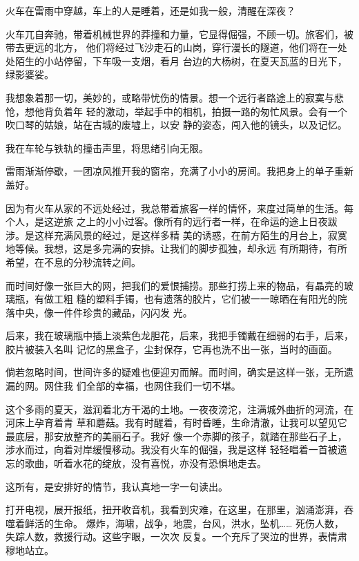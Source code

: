 		火车在雷雨中穿越，车上的人是睡着，还是如我一般，清醒在深夜？

		火车兀自奔驰，带着机械世界的莽撞和力量，它显得倔强，不顾一切。旅客们，被带去更远的北方，
	他们将经过飞沙走石的山岗，穿行漫长的隧道，他们将在一处处陌生的小站停留，下车吸一支烟，看月
	台边的大杨树，在夏天瓦蓝的日光下，绿影婆娑。

		我想象着那一切，美妙的，或略带忧伤的情景。想一个远行者路途上的寂寞与悲怆，想他背负着年
	轻的激动，举起手中的相机，拍摄一路的匆忙风景。会有一个吹口琴的姑娘，站在古城的废墟上，以安
	静的姿态，闯入他的镜头，以及记忆。

		我在车轮与铁轨的撞击声里，将思绪引向无限。

		雷雨渐渐停歇，一团凉风推开我的窗帘，充满了小小的房间。我把身上的单子重新盖好。

		因为有火车从家的不远处经过，我总带着旅客一样的情怀，来度过简单的生活。每个人，是这逆旅
	之上的小小过客。像所有的远行者一样，在命运的途上日夜跋涉。是这样充满风景的经过，是这样多精
	美的诱惑，在前方陌生的月台上，寂寞地等候。我想，这是多完满的安排。让我们的脚步孤独，却永远
	有所期待，有所希望，在不息的分秒流转之间。

		而时间好像一张巨大的网，把我们的爱恨捕捞。那些打捞上来的物品，有晶亮的玻璃瓶，有做工粗
	糙的塑料手镯，也有遗落的胶片，它们被一一晾晒在有阳光的院落中央，像一件件珍贵的藏品，闪闪发
	光。

		后来，我在玻璃瓶中插上淡紫色龙胆花，后来，我把手镯戴在细弱的右手，后来，胶片被装入名叫
	记忆的黑盒子，尘封保存，它再也洗不出一张，当时的画面。

		倘若忽略时间，世间许多的疑难也便迎刃而解。而时间，确实是这样一张，无所遗漏的网。网住我
	们全部的幸福，也网住我们一切不堪。

		这个多雨的夏天，滋润着北方干渴的土地。一夜夜滂沱，注满城外曲折的河流，在河床上孕育着青
	草和蘑菇。我有时醒着，有时昏睡，生命清澈，让我可以望见它最底层，那安放整齐的美丽石子。我好
	像一个赤脚的孩子，就踏在那些石子上，涉水而过，向着对岸缓慢移动。我没有火车的倔强，我是这样
	轻轻唱着一首被遗忘的歌曲，听着水花的绽放，没有喜悦，亦没有恐惧地走去。

		这所有，是安排好的情节，我认真地一字一句读出。

	\endwriting



		打开电视，展开报纸，扭开收音机，我看到灾难，在这里，在那里，汹涌澎湃，吞噬着鲜活的生命。
	爆炸，海啸，战争，地震，台风，洪水，坠机…… 死伤人数，失踪人数，救援行动。这些字眼，一次次
	反复。一个充斥了哭泣的世界，表情肃穆地站立。


